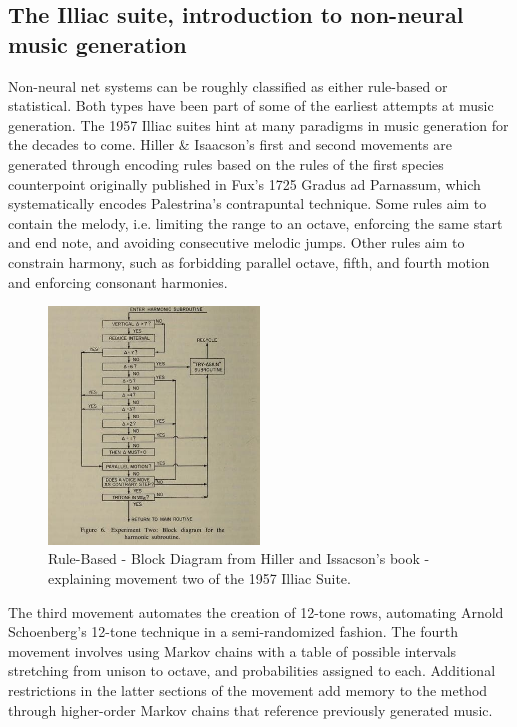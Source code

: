 \subsection{The Illiac suite, introduction to non-neural music generation}

Non-neural net systems can be roughly classified as either rule-based or statistical. Both types have been part of some of the earliest attempts at music generation. The 1957 Illiac suites \cite{Funk_2018}\cite{Hiller_Isaacson_1959} hint at many paradigms in music generation for the decades to come. Hiller \& Isaacson’s first and second movements are generated through encoding rules based on the rules of the first species counterpoint originally published in Fux’s 1725 Gradus ad Parnassum\cite{Fux_1725}, which systematically encodes Palestrina’s contrapuntal technique. Some rules aim to contain the melody, i.e. limiting the range to an octave, enforcing the same start and end note, and avoiding consecutive melodic jumps. Other rules aim to constrain harmony, such as forbidding parallel octave, fifth, and fourth motion and enforcing consonant harmonies. 

\begin{figure}[H]
    \centering
    \includegraphics[width=0.5\textwidth]{IMAGES/IlliacRuleBased.jpg} 
    \caption{Rule-Based - Block Diagram from Hiller and Issacson’s book  - explaining movement two of the 1957 Illiac Suite. }
    \label{fig:hillerissacson}
\end{figure}


The third movement automates the creation of 12-tone rows, automating Arnold Schoenberg’s 12-tone technique in a semi-randomized fashion. The fourth movement involves using Markov chains with a table of possible intervals stretching from unison to octave, and probabilities assigned to each. Additional restrictions in the latter sections of the movement add memory to the method through higher-order Markov chains that reference previously generated music. 

